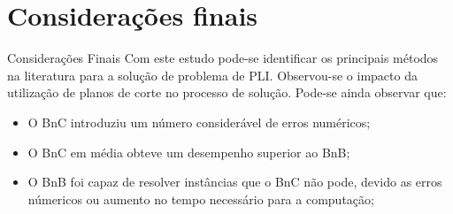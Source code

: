 \documentclass{beamer}
\begin{document}
\section{Considerações finais}
\begin{frame}[c]{Considerações Finais}
    Com este estudo pode-se identificar os principais métodos na literatura para a solução de problema de PLI. Observou-se
    o impacto da utilização de planos de corte no processo de solução. Pode-se ainda observar que:

    \begin{itemize}
        \item O BnC introduziu um número considerável de erros numéricos;
        \item O BnC em média obteve um desempenho superior ao BnB;
        \item O BnB foi capaz de resolver instâncias que o BnC não pode, devido as erros númericos
            ou aumento no tempo necessário para a computação;
    \end{itemize}
\end{frame}
\end{document}
